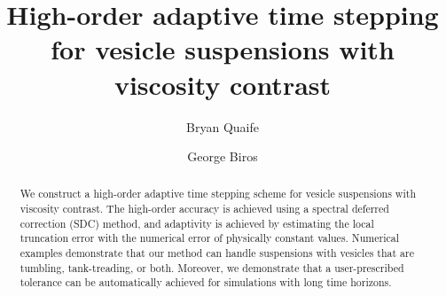 \documentclass[3p,times,procedia]{elsarticle}
\begin{document}
\begin{frontmatter}




\title{High-order adaptive time stepping for vesicle suspensions with
viscosity contrast}



\author[a]{Bryan Quaife} 
\author[a]{George Biros}

\address[a]{Institute for Computational Engineering and Sciences,
University of Texas, Austin, Texas, USA}

\begin{abstract}
We construct a high-order adaptive time stepping scheme for vesicle
suspensions with viscosity contrast.  The high-order accuracy is
achieved using a spectral deferred correction (SDC) method, and
adaptivity is achieved by estimating the local truncation error with
the numerical error of physically constant values.  Numerical examples
demonstrate that our method can handle suspensions with vesicles that
are tumbling, tank-treading, or both.  Moreover, we demonstrate that a
user-prescribed tolerance can be automatically achieved for simulations
with long time horizons.
\end{abstract}


\end{frontmatter}
\end{document}
